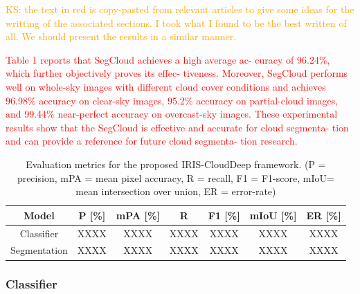 \documentclass[amt, article]{copernicus}
\begin{document}
\textcolor{orange}{KS: the text in red is copy-pasted from relevant articles to give some ideas for the writting of the associated sections. I took what I found to be the best written of all. We should present the results in a similar manner. }

\textcolor{red}{Table 1 reports that SegCloud achieves a high average ac-
curacy of 96.24\%, which further objectively proves its effec-
tiveness. Moreover, SegCloud performs well on whole-sky
images with different cloud cover conditions and achieves
96.98\% accuracy on clear-sky images, 95.2\% accuracy on
partial-cloud images, and 99.44\% near-perfect accuracy on overcast-sky images. These experimental results show that
the SegCloud is effective and accurate for cloud segmenta-
tion and can provide a reference for future cloud segmenta-
tion research.}

\begin{table}[t]
\begin{center}
    \caption{Evaluation metrics for the proposed IRIS-CloudDeep framework. (P = precision, mPA = mean pixel accuracy, R = recall, F1 = F1-score, mIoU= mean intersection over union, ER = error-rate)}
    \begin{tabular}{c c c c c c c} 
    \tophline \hline
     Model & P [\%] & mPA [\%] & R & F1 [\%] & mIoU [\%] & ER [\%] \\ [1.0ex]
     \hline
     Classifier & XXXX & XXXX & XXXX & XXXX & XXXX & XXXX \\ [1.0ex]
     Segmentation & XXXX & XXXX & XXXX & XXXX & XXXX & XXXX \\
     \hline
    \end{tabular}
    \belowtable{}
    \end{center}
\end{table}



\subsubsection{Classifier}
\end{document}

